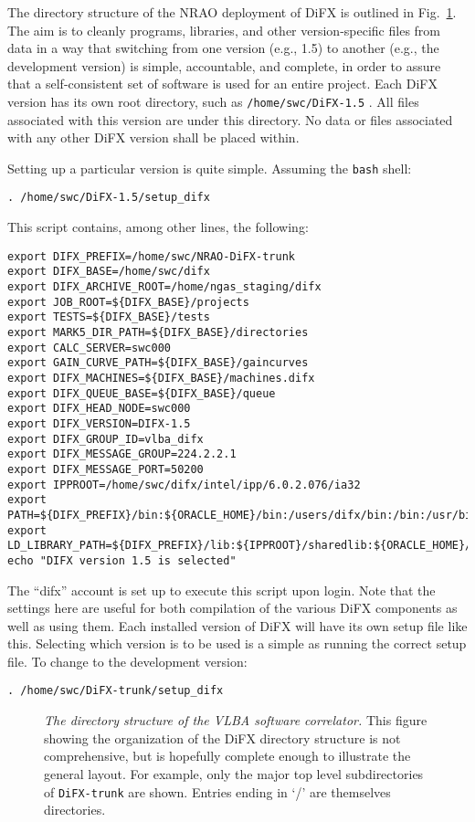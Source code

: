 The directory structure of the NRAO deployment of DiFX is outlined in Fig.~\ref{fig:dirtree}.
The aim is to cleanly programs, libraries, and other version-specific files from data in a way that switching from one version (e.g., 1.5) to another (e.g., the development version) is simple, accountable, and complete, in order to assure that a self-consistent set of software is used for an entire project.
Each DiFX version has its own root directory, such as {\tt /home/swc/DiFX-1.5} .
All files associated with this version are under this directory.
No data or files associated with any other DiFX version shall be placed within.

Setting up a particular version is quite simple.
Assuming the {\tt bash} shell:

{\tt . /home/swc/DiFX-1.5/setup\_difx}

This script contains, among other lines, the following:

\begin{verbatim}
export DIFX_PREFIX=/home/swc/NRAO-DiFX-trunk
export DIFX_BASE=/home/swc/difx
export DIFX_ARCHIVE_ROOT=/home/ngas_staging/difx
export JOB_ROOT=${DIFX_BASE}/projects
export TESTS=${DIFX_BASE}/tests
export MARK5_DIR_PATH=${DIFX_BASE}/directories
export CALC_SERVER=swc000
export GAIN_CURVE_PATH=${DIFX_BASE}/gaincurves
export DIFX_MACHINES=${DIFX_BASE}/machines.difx
export DIFX_QUEUE_BASE=${DIFX_BASE}/queue
export DIFX_HEAD_NODE=swc000
export DIFX_VERSION=DIFX-1.5
export DIFX_GROUP_ID=vlba_difx
export DIFX_MESSAGE_GROUP=224.2.2.1
export DIFX_MESSAGE_PORT=50200
export IPPROOT=/home/swc/difx/intel/ipp/6.0.2.076/ia32
export PATH=${DIFX_PREFIX}/bin:${ORACLE_HOME}/bin:/users/difx/bin:/bin:/usr/bin
export LD_LIBRARY_PATH=${DIFX_PREFIX}/lib:${IPPROOT}/sharedlib:${ORACLE_HOME}/lib
echo "DIFX version 1.5 is selected"
\end{verbatim}

The ``difx'' account is set up to execute this script upon login.
Note that the settings here are useful for both compilation of the various DiFX components as well as using them.
Each installed version of DiFX will have its own setup file like this.
Selecting which version is to be used is a simple as running the correct setup file.
To change to the development version:

{\tt . /home/swc/DiFX-trunk/setup\_difx}

\begin{figure}[h]
\begin{center}
\caption[dirtree]{
{\em The directory structure of the VLBA software correlator.}  
This figure showing the organization of the DiFX directory structure is not comprehensive, but is hopefully complete enough to illustrate the general layout.
For example, only the major top level subdirectories of {\tt DiFX-trunk} are shown.
Entries ending in `/' are themselves directories.
\label{fig:dirtree}
}
\end{center}
\end{figure}

